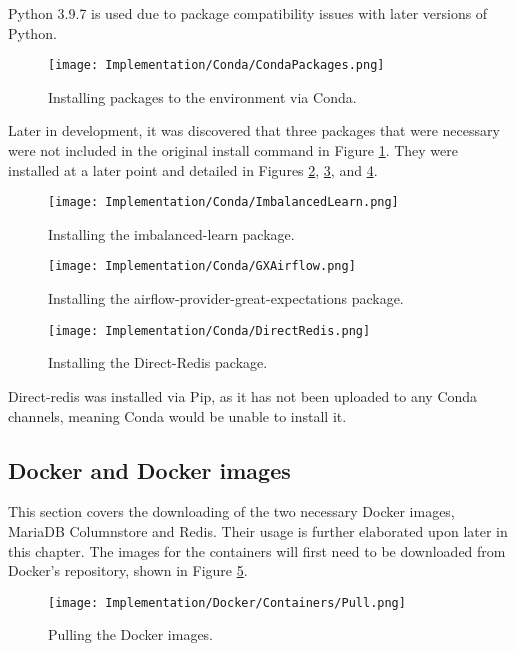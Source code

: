 \para Python 3.9.7 is used due to package compatibility issues with later versions of Python.

\begin{figure}[H]
    \centering
    \texttt{[image: Implementation/Conda/CondaPackages.png]}
    \caption{Installing packages to the environment via Conda.}
    \label{fig:CondaPackages}
\end{figure}

\para Later in development, it was discovered that three packages that were necessary were not included 
in the original install command in Figure \ref{fig:CondaPackages}. They were installed at a later point and 
detailed in Figures \ref{fig:imbLearnInstall}, \ref{fig:AirflowGXInstall}, and \ref{fig:directRedisInstall}.

\begin{figure}[H]
    \centering
    \texttt{[image: Implementation/Conda/ImbalancedLearn.png]}
    \caption{Installing the imbalanced-learn package.}
    \label{fig:imbLearnInstall}
\end{figure}

\begin{figure}[H]
    \centering
    \texttt{[image: Implementation/Conda/GXAirflow.png]}
    \caption{Installing the airflow-provider-great-expectations package.}
    \label{fig:AirflowGXInstall}
\end{figure}

\begin{figure}[H]
    \centering
    \texttt{[image: Implementation/Conda/DirectRedis.png]}
    \caption{Installing the Direct-Redis package.}
    \label{fig:directRedisInstall}
\end{figure}

\para Direct-redis was installed via Pip, as it has not been uploaded to any Conda
channels, meaning Conda would be unable to install it.

\pagebreak 
\subsection{Docker and Docker images}
This section covers the downloading of the two necessary Docker images, MariaDB Columnstore and Redis. 
Their usage is further elaborated upon later in this chapter. The images for the containers will first need to be
downloaded from Docker's repository, shown in Figure \ref{fig:DockerPull}.

\begin{figure}[H]
    \centering
    \texttt{[image: Implementation/Docker/Containers/Pull.png]}
    \caption{Pulling the Docker images.}
    \label{fig:DockerPull}
\end{figure}


